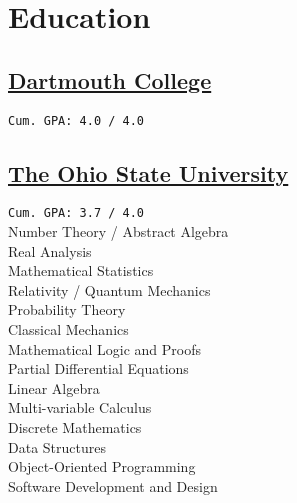 \documentclass[]{Farhan_Resume_Class}
\begin{document}
%
%

%
%

%
%

\begin{minipage}[t]{0.25\textwidth}

    \section{Education}
    \subsection{\href{https://dartmouth.edu/}{Dartmouth College}}
    \texttt{Cum. GPA: 4.0 / 4.0} \\
    
    \sectionsep
    \subsection{\href{https://www.osu.edu/}{The Ohio State University}}
    \texttt{Cum. GPA: 3.7 / 4.0} \\
    Number Theory / Abstract Algebra \\
    Real Analysis \\
    Mathematical Statistics \\
    Relativity / Quantum Mechanics \\
    Probability Theory \\
    Classical Mechanics \\
    Mathematical Logic and Proofs \\
    Partial Differential Equations \\
    Linear Algebra\\
    Multi-variable Calculus\\
    Discrete Mathematics\\
    Data Structures \\
    Object-Oriented Programming\\
    Software Development and Design\\


\end{minipage}
\end{document}
